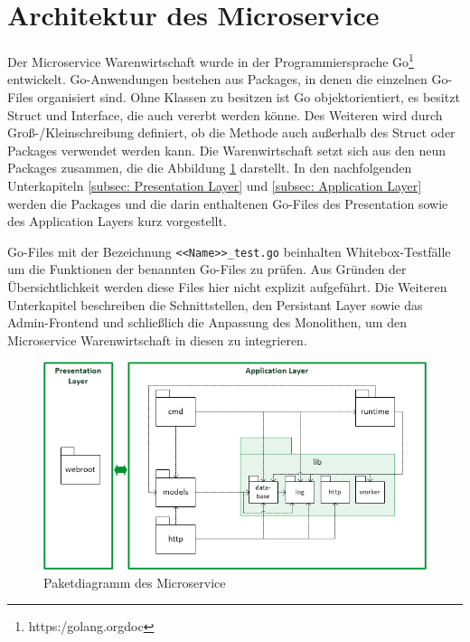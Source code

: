 \section{Architektur des Microservice}
\label{sec: Architektur des Microservice}
Der Microservice Warenwirtschaft wurde in der Programmiersprache Go\footnote{https:\//golang.org\/doc\/} entwickelt.
Go-Anwendungen bestehen aus Packages, in denen die einzelnen Go-Files organisiert sind.
Ohne Klassen zu besitzen ist Go objektorientiert, es besitzt Struct und Interface, die auch vererbt werden könne.
Des Weiteren wird durch Groß-/Kleinschreibung definiert, ob die Methode auch außerhalb des Struct oder Packages verwendet werden kann.
Die Warenwirtschaft setzt sich aus den neun Packages zusammen, die die Abbildung \ref{pic:Struktur des Microservice} darstellt. In den nachfolgenden Unterkapiteln \ref{subsec: Presentation Layer} und \ref{subsec: Application Layer} werden die Packages und die darin enthaltenen Go-Files des Presentation sowie des Application Layers kurz vorgestellt. \par
Go-Files mit der Bezeichnung \texttt{<<Name>>\_test.go} beinhalten Whitebox-Testfälle um die Funktionen der benannten Go-Files zu prüfen. Aus Gründen der Übersichtlichkeit werden diese Files hier nicht explizit aufgeführt. Die Weiteren Unterkapitel beschreiben die Schnittstellen, den Persistant Layer sowie das Admin-Frontend und schließlich die Anpassung des Monolithen, um den Microservice Warenwirtschaft in diesen zu integrieren.

\begin{figure}[H]
	\centering
	\includegraphics[width=0.95 \textwidth]{./pics/struktur.png}
	\caption{Paketdiagramm des Microservice}
	\label{pic:Struktur des Microservice}
\end{figure}

\newpage
